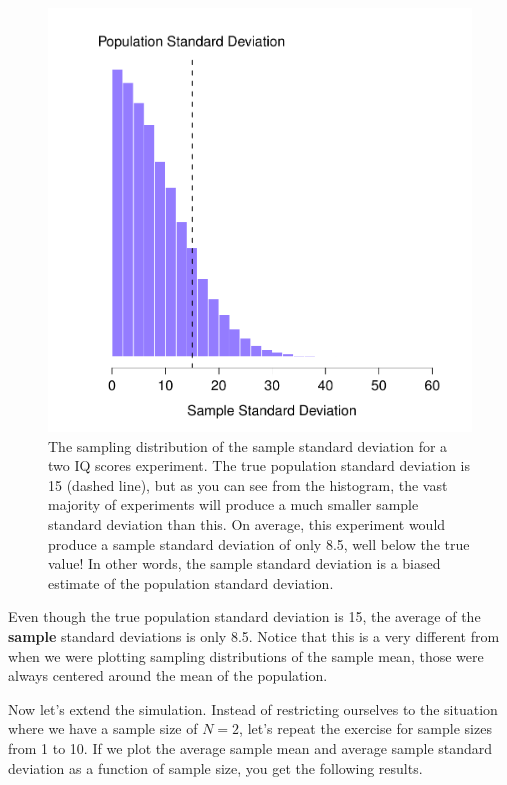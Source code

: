 \documentclass[
]{book}
\begin{document}
\begin{figure}
\centering
\includegraphics{navarro_img/estimation/sampdistsd.pdf}
\caption{\label{fig:sampdistsd}The sampling distribution of the sample standard deviation for a two IQ scores experiment. The true population standard deviation is 15 (dashed line), but as you can see from the histogram, the vast majority of experiments will produce a much smaller sample standard deviation than this. On average, this experiment would produce a sample standard deviation of only 8.5, well below the true value! In other words, the sample standard deviation is a biased estimate of the population standard deviation.}
\end{figure}

Even though the true population standard deviation is 15, the average of the \textbf{sample} standard deviations is only 8.5. Notice that this is a very different from when we were plotting sampling distributions of the sample mean, those were always centered around the mean of the population.

Now let's extend the simulation. Instead of restricting ourselves to the situation where we have a sample size of \(N=2\), let's repeat the exercise for sample sizes from 1 to 10. If we plot the average sample mean and average sample standard deviation as a function of sample size, you get the following results.
\end{document}
